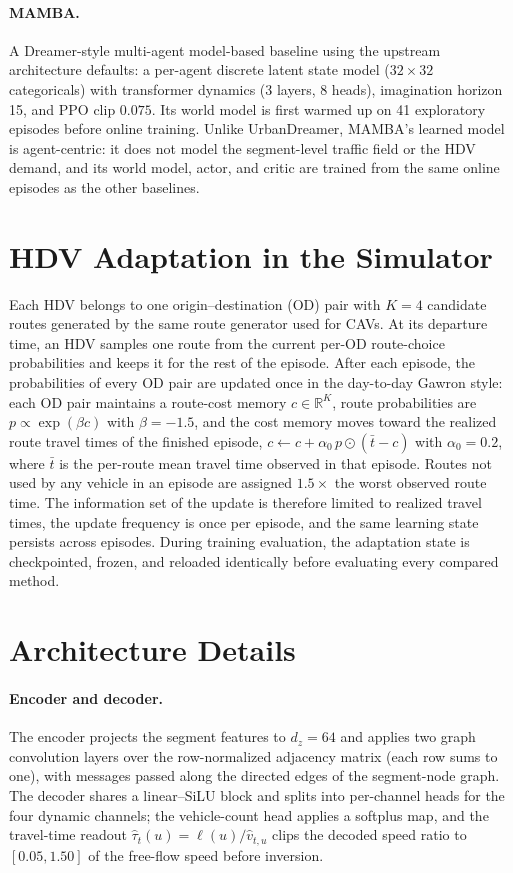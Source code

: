 \paragraph{MAMBA.}  A Dreamer-style multi-agent model-based baseline using
the upstream architecture defaults: a per-agent discrete latent state model
(\(32\times32\) categoricals) with transformer dynamics (3 layers, 8 heads),
imagination horizon 15, and PPO clip \(0.075\).  Its world model is first
warmed up on 41 exploratory episodes before online training.  Unlike
UrbanDreamer, MAMBA's
learned model is agent-centric: it does not model the segment-level traffic
field or the HDV demand, and its world model, actor, and critic are trained
from the same online episodes as the other baselines.

\section{HDV Adaptation in the Simulator}
\label{app:hdv-adaptation}

Each HDV belongs to one origin--destination (OD) pair with \(K=4\) candidate
routes generated by the same route generator used for CAVs.  At its departure
time, an HDV samples one route from the current per-OD route-choice
probabilities and keeps it for the rest of the episode.  After each episode,
the probabilities of every OD pair are updated once in the day-to-day Gawron
style: each OD pair maintains a route-cost memory \(c\in\mathbb{R}^{K}\),
route probabilities are \(p\propto\exp(\beta c)\) with \(\beta=-1.5\), and the
cost memory moves toward the realized route travel times of the finished
episode, \(c\leftarrow c+\alpha_{0}\,p\odot(\bar t-c)\) with \(\alpha_{0}=0.2\),
where \(\bar t\) is the per-route mean travel time observed in that episode.
Routes not used by any vehicle in an episode are assigned \(1.5\times\) the
worst observed route time.  The information set of the update is therefore
limited to realized travel times, the update frequency is once per episode,
and the same learning state persists across episodes.  During training
evaluation, the adaptation state is checkpointed, frozen, and reloaded
identically before evaluating every compared method.

\section{Architecture Details}
\label{app:architecture}

\paragraph{Encoder and decoder.}  The encoder projects the segment
features to \(d_z=64\) and applies two graph convolution layers over the
row-normalized adjacency matrix (each row sums to one), with messages passed
along the directed edges of the segment-node graph.  The decoder shares a
linear--SiLU block and splits into per-channel heads for the four dynamic
channels; the vehicle-count head applies a softplus map, and the travel-time
readout \(\widehat\tau_t(u)=\ell(u)/\widehat v_{t,u}\) clips the decoded speed
ratio to \([0.05,1.50]\) of the free-flow speed before inversion.

